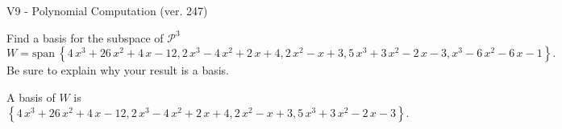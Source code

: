 \begin{exercise}
  \begin{exerciseTitle}V9 - Polynomial Computation (ver. 247)\end{exerciseTitle}
  \begin{exerciseStatement}
    Find a basis for the subspace of \(\mathcal{P}^3\) 
\[W=\mathrm{span}\ \left\{4 \, x^{3} + 26 \, x^{2} + 4 \, x - 12 , 2 \, x^{3} - 4 \, x^{2} + 2 \, x + 4 , 2 \, x^{2} - x + 3 , 5 \, x^{3} + 3 \, x^{2} - 2 \, x - 3 , x^{3} - 6 \, x^{2} - 6 \, x - 1\right\}.\]
 Be sure to explain why your result is a basis.


  \end{exerciseStatement}
  \begin{exerciseAnswer}
   A basis of \(W\) is  \(\left\{4 \, x^{3} + 26 \, x^{2} + 4 \, x - 12 , 2 \, x^{3} - 4 \, x^{2} + 2 \, x + 4 , 2 \, x^{2} - x + 3 , 5 \, x^{3} + 3 \, x^{2} - 2 \, x - 3\right\}\).
  


  \end{exerciseAnswer}
\end{exercise}